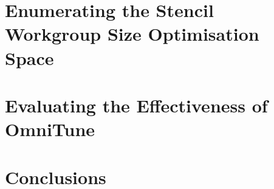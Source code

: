 %

\chapter{Enumerating the Stencil Workgroup Size Optimisation Space}\label{chap:methodology}


%

\chapter{Evaluating the Effectiveness of OmniTune}\label{chap:evaluation}



%
\chapter{Conclusions}\label{chap:conclusions}



\clearpage
\label{bibliography}
\printbibliography


